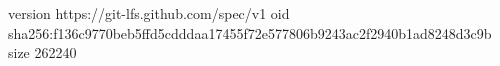 version https://git-lfs.github.com/spec/v1
oid sha256:f136c9770beb5ffd5cdddaa17455f72e577806b9243ac2f2940b1ad8248d3c9b
size 262240
